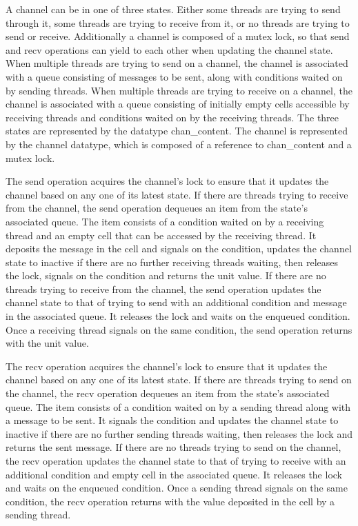 \documentclass{article}
\begin{document}
A channel can be in one of three states.  Either some threads are trying to send through it,
some threads are trying to receive from it, or no threads are trying to send or receive.
Additionally a channel is composed of a mutex lock, so that send and recv operations can yield
to each other when updating the channel state.  When multiple threads are trying to send on a
channel, the channel is associated with a queue consisting of messages to be sent, along with
conditions waited on by sending threads. When multiple threads are trying to receive on a
channel, the channel is associated with a queue consisting of initially empty cells accessible
by receiving threads and conditions waited on by the receiving threads. The three states are
represented by the datatype chan\_content.  The channel is represented by the channel datatype,
which is composed of a reference to chan\_content and a mutex lock.  

The send operation acquires the channel's lock to ensure that it updates the channel based on
any one of its latest state.  If there are threads trying to receive from the channel, the send
operation dequeues an item from the state's associated queue.  The item consists of a condition
waited on by a receiving thread and an empty cell that can be accessed by the receiving thread.
It deposits the message in the cell and signals on the condition, updates the channel state to
inactive if there are no further receiving threads waiting, then releases the lock, signals on
the condition and returns the unit value.  If there are no threads trying to receive from the
channel, the send operation updates the channel state to that of trying to send with an
additional condition and message in the associated queue.  It releases the lock and waits on
the enqueued condition.  Once a receiving thread signals on the same condition, the send
operation returns with the unit value.

The recv operation acquires the channel's lock to ensure that it updates the channel based on
any one of its latest state.  If there are threads trying to send on the channel, the recv
operation dequeues an item from the state's associated queue.  The item consists of a condition
waited on by a sending thread along with a message to be sent.  It signals the condition and
updates the channel state to inactive if there are no further sending threads waiting, then
releases the lock and returns the sent message.  If there are no threads trying to send on the
channel, the recv operation updates the channel state to that of trying to receive with an
additional condition and empty cell in the associated queue.  It releases the lock and waits on
the enqueued condition.  Once a sending thread signals on the same condition, the recv
operation returns with the value deposited in the cell by a sending thread.
\end{document}
